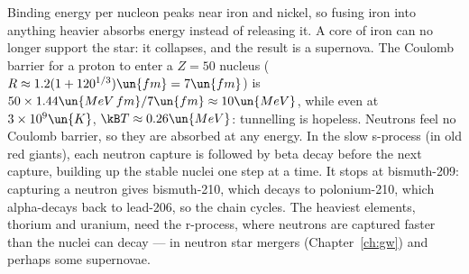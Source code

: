  Binding energy per nucleon peaks near iron and nickel, so fusing iron into anything heavier absorbs energy instead of releasing it. A core of iron can no longer support the star: it collapses, and the result is a supernova. The Coulomb barrier for a proton to enter a $Z = 50$ nucleus ($R\approx1.2(1+120^{1/3})\un{fm} = 7\un{fm}$) is $50\times1.44\un{MeV\,fm}/7\un{fm}\approx10\un{MeV}$, while even at $3\times10^9\un{K}$, $\kB T\approx0.26\un{MeV}$: tunnelling is hopeless. Neutrons feel no Coulomb barrier, so they are absorbed at any energy. In the slow s-process (in old red giants), each neutron capture is followed by beta decay before the next capture, building up the stable nuclei one step at a time. It stops at bismuth-209: capturing a neutron gives bismuth-210, which decays to polonium-210, which alpha-decays back to lead-206, so the chain cycles. The heaviest elements, thorium and uranium, need the r-process, where neutrons are captured faster than the nuclei can decay --- in neutron star mergers (Chapter~\ref{ch:gw}) and perhaps some supernovae.
